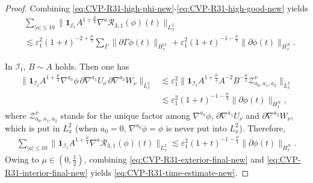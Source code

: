 \documentclass[11pt,twoside]{article}
\def\f{\frac}
\def\p{\partial}
\def\ve{\varepsilon}
\def\ls{\lesssim}
\theoremstyle{plain}
\theoremstyle{definition}
\theoremstyle{assumption}
\numberwithin{equation}{section}
\begin{document}
\begin{proof}
		
		Combining \eqref{eq:CVP-R31-high-phi-new}-\eqref{eq:CVP-R31-high-good-new} yields
		\begin{equation}
			\label{eq:CVP-R31-exterior-final-new}
			\begin{aligned}
				&
				\sum_{|a|\le 10}
				\big\|
				\mathbf 1_{\mathcal E_t}
				A^{1+\frac{\mu}{4}}
				\nabla^a\mathcal R_{3,1}(\phi)(t)
				\big\|_{L^2_x}
				\\
				&
				\ls
				\ve_1^2
				(1+t)^{-2+\frac{\mu}{4}}
				\sum_{\Gamma}
				\|\p\Gamma\phi(t)\|_{H^{11}_x}
				+
				\ve_1^2
				(1+t)^{-1-\frac{\mu}{4}}
				\|\p\phi(t)\|_{H^N_x}.
			\end{aligned}
		\end{equation}
		
		In  $\mathcal I_t$,  \(B\sim A\) holds. Then one has
		\begin{equation}
			\label{eq:CVP-R31-interior-new}
			\begin{aligned}
				\big\|
				\mathbf 1_{\mathcal I_t}
				A^{1+\frac{\mu}{4}}
				\nabla^{a_0}\phi\,
				\p\nabla^{a_1}U_\nu\,
				\p\nabla^{a_2}W_\nu
				\big\|_{L^2_x}
				&\ls
				\ve_1^2
				\big\|
				\mathbf 1_{\mathcal I_t}
				A^{1+\frac{\mu}{4}}
				A^{-2}B^{-\frac{\mu}{2}}
				\mathcal Z_{a_0,a_1,a_2}^{\nu}
				\big\|_{L^2_x}\\
				&\ls
				\ve_1^2
				(1+t)^{-1-\frac{\mu}{4}}
				\|\p\phi(t)\|_{H^N_x},
			\end{aligned}
		\end{equation}
		where \(\mathcal Z_{a_0,a_1,a_2}^{\nu}\) stands for the unique factor among
		\(\nabla^{a_0}\phi\), \(\p\nabla^{a_1}U_\nu\) and
		\(\p\nabla^{a_2}W_\nu\),  which is put in \(L^2_x\) (when $a_0=0$, $\nabla^{a_0}\phi=\phi$ is never  put into  \(L^2_x\)).
		Therefore,
		\begin{equation}
			\label{eq:CVP-R31-interior-final-new}
			\begin{aligned}
				\sum_{|a|\le 10}
				\big\|
				\mathbf 1_{\mathcal I_t}
				A^{1+\frac{\mu}{4}}
				\nabla^a\mathcal R_{3,1}(\phi)(t)
				\big\|_{L^2_x}
				\ls
				\ve_1^2
				(1+t)^{-1-\frac{\mu}{4}}
				\|\p\phi(t)\|_{H^N_x}.
			\end{aligned}
		\end{equation}
	Owing to $\mu\in(0,\f12)$, combining \eqref{eq:CVP-R31-exterior-final-new} and \eqref{eq:CVP-R31-interior-final-new}
		yields \eqref{eq:CVP-R31-time-estimate-new}.
			

\end{proof}
\end{document}
